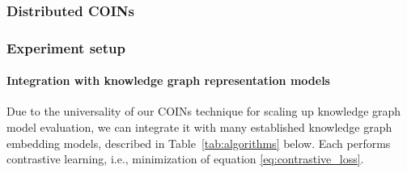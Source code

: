 \subsubsection{Distributed COINs}



\subsubsection{Experiment setup}

\paragraph{Integration with knowledge graph representation models}
Due to the universality of our COINs technique for scaling up knowledge graph model evaluation, we can integrate it with many established knowledge graph embedding models, described in Table~\ref{tab:algorithms} below. Each performs contrastive learning, i.e., minimization of equation \eqref{eq:contrastive_loss}. 
